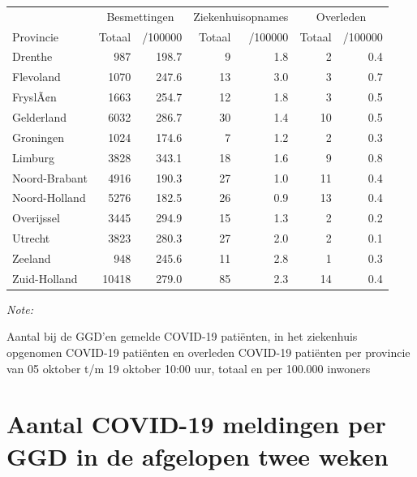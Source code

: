 \documentclass[
  english,
  man,floatsintext]{apa6}
\begin{document}
\begin{table}
\centering
\begin{threeparttable}
\begin{tabular}{lrrrrrr}
\toprule
\multicolumn{1}{c}{ } & \multicolumn{2}{c}{Besmettingen} & \multicolumn{2}{c}{Ziekenhuisopnames} & \multicolumn{2}{c}{Overleden} \\
\cmidrule(l{3pt}r{3pt}){2-3} \cmidrule(l{3pt}r{3pt}){4-5} \cmidrule(l{3pt}r{3pt}){6-7}
Provincie & Totaal & /100000 & Totaal & /100000 & Totaal & /100000\\
\midrule
Drenthe & 987 & 198.7 & 9 & 1.8 & 2 & 0.4\\
Flevoland & 1070 & 247.6 & 13 & 3.0 & 3 & 0.7\\
FryslÃ¢n & 1663 & 254.7 & 12 & 1.8 & 3 & 0.5\\
Gelderland & 6032 & 286.7 & 30 & 1.4 & 10 & 0.5\\
Groningen & 1024 & 174.6 & 7 & 1.2 & 2 & 0.3\\
Limburg & 3828 & 343.1 & 18 & 1.6 & 9 & 0.8\\
Noord-Brabant & 4916 & 190.3 & 27 & 1.0 & 11 & 0.4\\
Noord-Holland & 5276 & 182.5 & 26 & 0.9 & 13 & 0.4\\
Overijssel & 3445 & 294.9 & 15 & 1.3 & 2 & 0.2\\
Utrecht & 3823 & 280.3 & 27 & 2.0 & 2 & 0.1\\
Zeeland & 948 & 245.6 & 11 & 2.8 & 1 & 0.3\\
Zuid-Holland & 10418 & 279.0 & 85 & 2.3 & 14 & 0.4\\
\bottomrule
\end{tabular}
\begin{tablenotes}
\item \textit{Note: } 
\item Aantal bij de GGD’en gemelde COVID-19 patiënten, in het ziekenhuis opgenomen COVID-19 patiënten en overleden COVID-19 patiënten per provincie van 05 oktober t/m 19 oktober 10:00 uur, totaal en per 100.000 inwoners
\end{tablenotes}
\end{threeparttable}
\end{table}

\newpage

\hypertarget{aantal-covid-19-meldingen-per-ggd-in-de-afgelopen-twee-weken}{%
\section{Aantal COVID-19 meldingen per GGD in de afgelopen twee weken}\label{aantal-covid-19-meldingen-per-ggd-in-de-afgelopen-twee-weken}}
\end{document}
